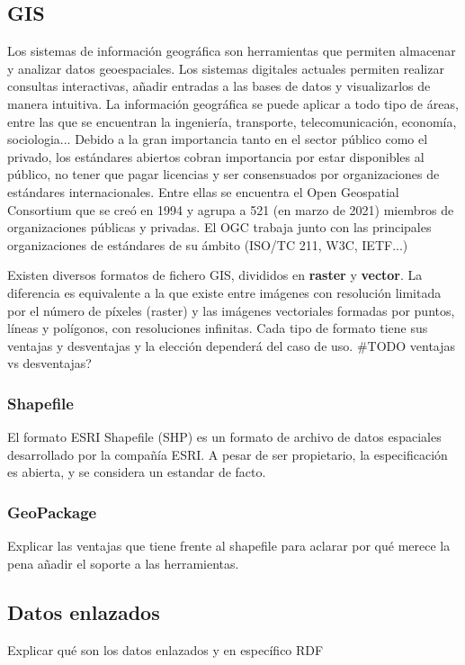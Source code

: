\subsection{GIS} Los sistemas de información geográfica son herramientas que permiten almacenar y analizar datos
geoespaciales. Los sistemas digitales actuales permiten realizar consultas interactivas, añadir entradas a las
bases de datos y visualizarlos de manera intuitiva. La información geográfica se puede aplicar a todo tipo de
áreas, entre las que se encuentran la ingeniería, transporte, telecomunicación, economía, sociologia... Debido a
la gran importancia tanto en el sector público como el privado\cite{gis-standards}, los estándares abiertos
cobran importancia por estar disponibles al público, no tener que pagar licencias y ser consensuados por
organizaciones de estándares internacionales. Entre ellas se encuentra el Open Geospatial Consortium que se creó
en 1994 y agrupa a 521 (en marzo de 2021) miembros de organizaciones públicas y privadas.\cite{ogc-members}
El OGC trabaja junto con las principales organizaciones de estándares de su ámbito (ISO/TC 211, W3C,
IETF...) \cite{ogc-whitepaper}

Existen diversos formatos de fichero GIS, divididos en \textbf{raster} y \textbf{vector}. La diferencia es
equivalente a la que existe entre imágenes con resolución limitada por el número de píxeles (raster) y las 
imágenes vectoriales formadas por puntos, líneas y polígonos, con resoluciones infinitas. Cada tipo de formato
tiene sus ventajas y desventajas y la elección dependerá del caso de uso. \#TODO ventajas vs desventajas?

\subsubsection{Shapefile} El formato ESRI Shapefile (SHP) es un formato de archivo de datos espaciales
desarrollado por la compañía ESRI. A pesar de ser propietario, la especificación es abierta, y se considera un
estandar de facto.

\subsubsection{GeoPackage} Explicar las ventajas que tiene frente al shapefile para aclarar
por qué merece la pena añadir el soporte a las herramientas.

\subsection{Datos enlazados} Explicar qué son los datos enlazados y en específico RDF

